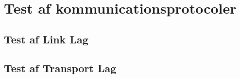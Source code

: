 \chapter{Test af kommunicationsprotocoler}\label{ch:test}


\section{Test af Link Lag}

\section{Test af Transport Lag}